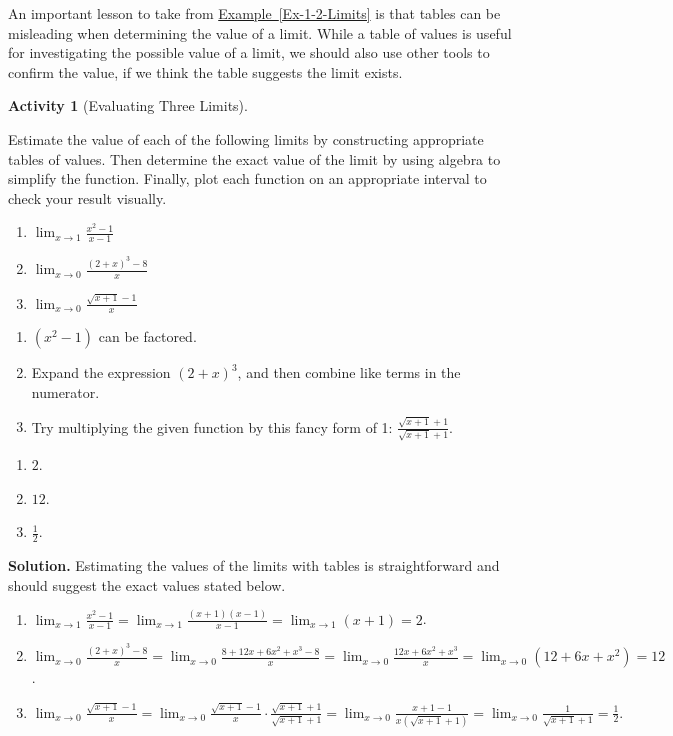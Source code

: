 \documentclass[10pt,]{book}
\theoremstyle{plain}
\theoremstyle{definition}
\theoremstyle{definition}
\theoremstyle{definition}
\theoremstyle{definition}
\newtheorem{activity}[project]{Activity}
\theoremstyle{definition}
\numberwithin{equation}{section}
\begin{document}
    An important lesson to take from \hyperref[Ex-1-2-Limits]{Example~\ref{Ex-1-2-Limits}} is that tables can be misleading when determining the value of a limit. While a table of values is useful for investigating the possible value of a limit, we should also use other tools to confirm the value, if we think the table suggests the limit exists.
\begin{activity}[Evaluating Three Limits]\label{act-1-2-1}

          Estimate the value of each of the following limits by constructing appropriate tables of values. Then determine the exact value of the limit by using algebra to simplify the function. Finally, plot each function on an appropriate interval to check your result visually.
\leavevmode%
\begin{enumerate}[label=\alph*]
\item\hypertarget{li-48}{}\(\lim_{x \to 1} \frac{x^2 - 1}{x-1}\)%
\item\hypertarget{li-49}{}\(\lim_{x \to 0} \frac{(2+x)^3 - 8}{x}\)%
\item\hypertarget{li-50}{}\(\lim_{x \to 0} \frac{\sqrt{x+1} - 1}{x}\)%
\end{enumerate}
\leavevmode%
\begin{enumerate}[label=\alph*]
\item\hypertarget{li-51}{}\((x^2 - 1)\) can be factored.%
\item\hypertarget{li-52}{}Expand the expression \((2+x)^3\), and then combine like terms in the numerator.%
\item\hypertarget{li-53}{}Try multiplying the given function by this fancy form of 1: \(\frac{\sqrt{x+1} + 1}{\sqrt{x+1} + 1}\).%
\end{enumerate}
\leavevmode%
\begin{enumerate}[label=\alph*lpha]
\item\hypertarget{li-54}{}\(2\).%
\item\hypertarget{li-55}{}\(12\).%
\item\hypertarget{li-56}{}\(\frac{1}{2}.\)%
\end{enumerate}
\par\medskip\noindent%
\textbf{Solution.}\quad 
        Estimating the values of the limits with tables is straightforward and should suggest the exact values stated below.
\leavevmode%
\begin{enumerate}[label=\alph*lpha]
\item\hypertarget{li-57}{}\(\lim_{x \to 1} \frac{x^2 - 1}{x-1} = \lim_{x \to 1} \frac{(x+1)(x-1)}{x-1} = \lim_{x \to 1} (x+1) = 2\).%
\item\hypertarget{li-58}{}\(\lim_{x \to 0} \frac{(2+x)^3 - 8}{x} = \lim_{x \to 0} \frac{8 + 12x + 6x^2 + x^3 - 8}{x} = \lim_{x \to 0} \frac{12x + 6x^2 + x^3}{x} =  \lim_{x \to 0} (12 + 6x + x^2) = 12\).%
\item\hypertarget{li-59}{}\(\lim_{x \to 0} \frac{\sqrt{x+1} - 1}{x} = \lim_{x \to 0} \frac{\sqrt{x+1} - 1}{x} \cdot \frac{\sqrt{x+1} + 1}{\sqrt{x+1} + 1} = \lim_{x \to 0} \frac{x+1-1}{x(\sqrt{x+1}+1)} = \lim_{x \to 0} \frac{1}{\sqrt{x+1}+1} = \frac{1}{2}.\)%
\end{enumerate}
\end{activity}
\end{document}
